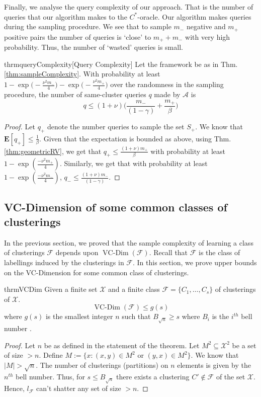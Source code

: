 \documentclass[12pt]{article}
\newcommand{\mb}{\mathbf}
\newcommand{\mc}{\mathcal}
\DeclareMathOperator*{\vcdim}{VC-Dim}
\begin{document}
Finally, we analyse the query complexity of our approach. That is the number of queries that our algorithm makes to the $C^*$-oracle. Our algorithm makes queries during the sampling procedure. We see that to sample $m_-$ negative and $m_+$ positive pairs the number of queries is `close' to $m_+ + m_-$ with very high probability. Thus, the number of `wasted' queries is small.  

\begin{restatable}{thrm}{queryComplexity}[Query Complexity]
\label{thm:queryComplexity}
Let the framework be as in Thm. \ref{thm:sampleComplexity}. With probability at least $1-\exp\big(-\frac{\nu^2m_-}{4}) - \exp\big(-\frac{\nu^2m_+}{4}\big)$ over the randomness in the sampling procedure, the number of same-cluster queries $q$ made by $\mc A$ is  
$$q \le (1+\nu)\bigg(\frac{m_-}{(1-\gamma)} + \frac{m_+}{\beta}\bigg)$$
\end{restatable}
\begin{proof}
Let $q_+$ denote the number queries to sample the set $S_+$. We know that $\mb E[q_+] \le \frac{1}{\beta}$. Given that the expectation is bounded as above, using Thm. \ref{thm:geometricRV}, we get that $q_+ \le \frac{(1+\nu)m_+}{\beta}$ with probability at least $1-\exp(\frac{-\nu^2m_+}{4})$. Similarly, we get that with probability at least $1-\exp(\frac{-\nu^2m_-}{4})$, $q_- \le \frac{(1+\nu)m_-}{(1-\gamma)}$.
\end{proof}

\subsection{VC-Dimension of some common classes of clusterings}
In the previous section, we proved that the sample complexity of learning a class of clusterings $\mc F$ depends upon $\vcdim({\mc F})$. Recall that ${\mc F}$ is the class of labellings induced by the clusterings in $\mc F$. In this section, we prove upper bounds on the VC-Dimension for some common class of clusterings. 

\begin{restatable}{thrm}{VCDim}
Given a finite set $\mc X$ and a finite class $\mc F = \{C_1, \ldots, C_s\}$ of clusterings of $\mc X$.
$$\vcdim({\mc F}) \le g(s)$$ where $g(s)$ is the smallest integer $n$ such that $B_{\sqrt n} \ge s$ where $B_i$ is the $i^{th}$ bell number \cite{bell2010number}. 
\end{restatable}
\begin{proof}
Let $n$ be as defined in the statement of the theorem. Let $M^2 \subseteq \mc X^2$ be a set of size $> n$. Define $M := \{x: (x, y) \in M^2 \text{ or } (y, x) \in M^2\}$. We know that $|M| > \sqrt n$. The number of clusterings (partitions) on $n$ elements is given by the $n^{th}$ bell number. Thus, for $s \le B_{\sqrt n}$ there exists a clustering $C' \not\in \mc F$ of the set $\mc X$. Hence, $l_{\mc F}$ can't shatter any set of size $> n$.
\end{proof}
\end{document}
